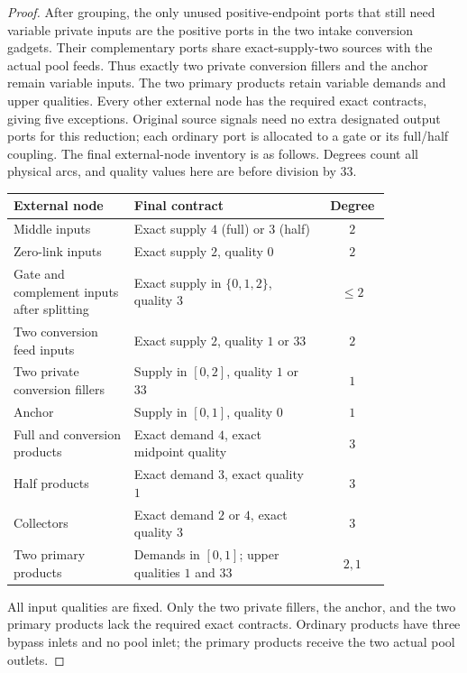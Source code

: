 \begin{proof}
After grouping, the only unused positive-endpoint ports that still
need variable private inputs are the positive ports in the two intake
conversion gadgets. Their complementary ports share exact-supply-two
sources with the actual pool feeds. Thus exactly two private conversion
fillers and the anchor remain variable inputs. The two primary products
retain variable demands and upper qualities. Every other external node
has the required exact contracts, giving five exceptions. Original source
signals need no extra designated output ports for this reduction; each
ordinary port is allocated to a gate or its full/half coupling.
The final external-node inventory is as follows. Degrees count all
physical arcs, and quality values here are before division by 33.
\begin{center}
\small
\begin{tabular}{p{0.32\linewidth}p{0.51\linewidth}c}
\toprule
External node & Final contract & Degree\\
\midrule
Middle inputs & Exact supply $4$ (full) or $3$ (half) & $2$\\
Zero-link inputs & Exact supply $2$, quality $0$ & $2$\\
Gate and complement inputs after splitting & Exact supply in
$\{0,1,2\}$, quality $3$ & $\le2$\\
Two conversion feed inputs & Exact supply $2$, quality $1$ or $33$ & $2$\\
Two private conversion fillers & Supply in $[0,2]$, quality $1$ or $33$ & $1$\\
Anchor & Supply in $[0,1]$, quality $0$ & $1$\\
Full and conversion products & Exact demand $4$, exact midpoint quality & $3$\\
Half products & Exact demand $3$, exact quality $1$ & $3$\\
Collectors & Exact demand $2$ or $4$, exact quality $3$ & $3$\\
Two primary products & Demands in $[0,1]$;
upper qualities $1$ and $33$ & $2,1$\\
\bottomrule
\end{tabular}
\end{center}
All input qualities are fixed. Only the two private fillers, the anchor,
and the two primary products lack the required exact contracts. Ordinary
products have three bypass inlets and no pool inlet; the primary products
receive the two actual pool outlets.


\end{proof}
